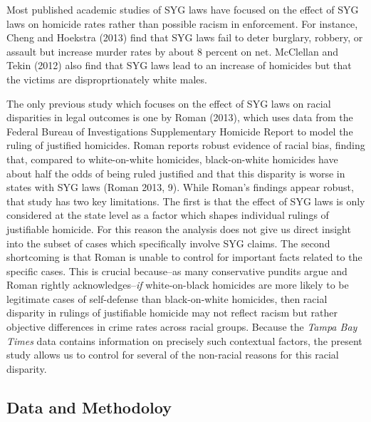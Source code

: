 \documentclass[12pt,article]{article}
\begin{document}
Most published academic studies of SYG laws have focused on the effect
of SYG laws on homicide rates rather than possible racism in
enforcement. For instance, Cheng and Hoekstra (2013) find that SYG laws
fail to deter burglary, robbery, or assault but increase murder rates by
about 8 percent on net. McClellan and Tekin (2012) also find that SYG
laws lead to an increase of homicides but that the victims are
disproprtionately white males.

The only previous study which focuses on the effect of SYG laws on
racial disparities in legal outcomes is one by Roman (2013), which uses
data from the Federal Bureau of Investigations Supplementary Homicide
Report to model the ruling of justified homicides. Roman reports robust
evidence of racial bias, finding that, compared to white-on-white
homicides, black-on-white homicides have about half the odds of being
ruled justified and that this disparity is worse in states with SYG laws
(Roman 2013, 9). While Roman's findings appear robust, that study has
two key limitations. The first is that the effect of SYG laws is only
considered at the state level as a factor which shapes individual
rulings of justifiable homicide. For this reason the analysis does not
give us direct insight into the subset of cases which specifically
involve SYG claims. The second shortcoming is that Roman is unable to
control for important facts related to the specific cases. This is
crucial because--as many conservative pundits argue and Roman rightly
acknowledges--\emph{if} white-on-black homicides are more likely to be
legitimate cases of self-defense than black-on-white homicides, then
racial disparity in rulings of justifiable homicide may not reflect
racism but rather objective differences in crime rates across racial
groups. Because the \emph{Tampa Bay Times} data contains information on
precisely such contextual factors, the present study allows us to
control for several of the non-racial reasons for this racial disparity.

\subsection{Data and Methodoloy}\label{data-and-methodoloy}
\end{document}
